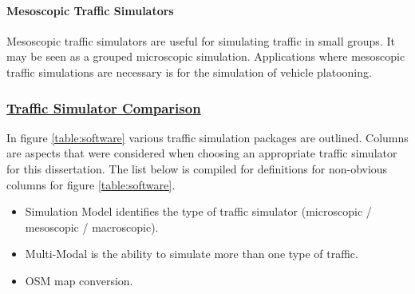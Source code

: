 \paragraph{Mesoscopic Traffic Simulators}
Mesoscopic traffic simulators are useful for simulating traffic in small groups. It may be seen as a grouped microscopic simulation. Applications where mesoscopic traffic simulations are necessary is for the simulation of vehicle platooning.

\subsubsection{\underline{Traffic Simulator Comparison}}
In figure \ref{table:software} various traffic simulation packages are outlined. Columns are aspects that were considered when choosing an appropriate traffic simulator for this dissertation. The list below is compiled for definitions for non-obvious columns for figure \ref{table:software}.
\begin{itemize}
    \item Simulation Model identifies the type of traffic simulator (microscopic / mesoscopic / macroscopic).
    \item Multi-Modal is the ability to simulate more than one type of traffic.
    \item \ac{OSM} map conversion.
\end{itemize}

